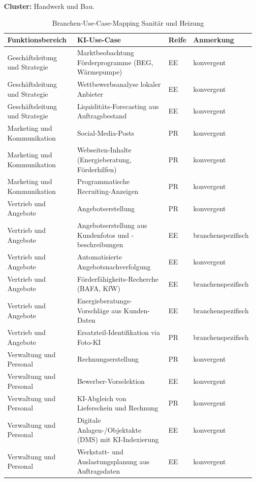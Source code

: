 \documentclass[a4paper,11pt]{article}
\begin{document}
\textbf{Cluster:} Handwerk und Bau.

\begin{table}[H]
\centering
\caption{Branchen-Use-Case-Mapping Sanitär und Heizung}
\label{tab:mapping-shk}
\small
\begin{tabular}{p{3.3cm}p{7.3cm}p{1cm}p{2.5cm}}
\toprule
\textbf{Funktionsbereich} & \textbf{KI-Use-Case} & \textbf{Reife} & \textbf{Anmerkung} \\
\midrule
Geschäftsleitung und Strategie & Marktbeobachtung Förderprogramme (BEG, Wärmepumpe) & EE & konvergent \\
Geschäftsleitung und Strategie & Wettbewerbsanalyse lokaler Anbieter & EE & konvergent \\
Geschäftsleitung und Strategie & Liquiditäts-Forecasting aus Auftragsbestand & EE & konvergent \\
Marketing und Kommunikation & Social-Media-Posts & PR & konvergent \\
Marketing und Kommunikation & Webseiten-Inhalte (Energieberatung, Förderhilfen) & PR & konvergent \\
Marketing und Kommunikation & Programmatische Recruiting-Anzeigen & PR & konvergent \\
Vertrieb und Angebote & Angebotserstellung & PR & konvergent \\
Vertrieb und Angebote & Angebotserstellung aus Kundenfotos und -beschreibungen & EE & branchenspezifisch \\
Vertrieb und Angebote & Automatisierte Angebotsnachverfolgung & EE & konvergent \\
Vertrieb und Angebote & Förderfähigkeits-Recherche (BAFA, KfW) & EE & branchenspezifisch \\
Vertrieb und Angebote & Energieberatungs-Vorschläge aus Kunden-Daten & EE & branchenspezifisch \\
Vertrieb und Angebote & Ersatzteil-Identifikation via Foto-KI & PR & branchenspezifisch \\
Verwaltung und Personal & Rechnungserstellung & PR & konvergent \\
Verwaltung und Personal & Bewerber-Vorselektion & EE & konvergent \\
Verwaltung und Personal & KI-Abgleich von Lieferschein und Rechnung & PR & konvergent \\
Verwaltung und Personal & Digitale Anlagen-/Objektakte (DMS) mit KI-Indexierung & EE & konvergent \\
Verwaltung und Personal & Werkstatt- und Auslastungsplanung aus Auftragsdaten & EE & konvergent \\

\end{tabular}
\end{table}
\end{document}
